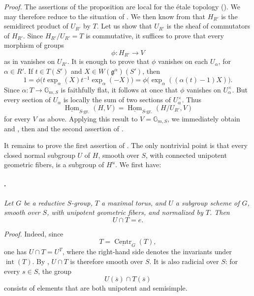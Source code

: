 \textit{Proof.}
The assertions of the proposition are local for the étale topology
\textup{()}. We may therefore reduce to the situation
of . We then know from  that \(H_{R'}\) is the semidirect
product of \(U_{R'}\) by \(T\). Let us show that \(U_{R'}\) is the
sheaf of commutators of \(H_{R'}\). Since
\(H_{R'}/U_{R'}=T\) is commutative, it suffices to prove that every
morphism of groups
\[
  \phi:H_{R'}\longrightarrow V
\]
as in \textup{} vanishes on \(U_{R'}\). It is enough to prove
that \(\phi\) vanishes on each \(U_\alpha\), for \(\alpha\in R'\).
If \(t\in T(S')\) and \(X\in W(\mathfrak g^\alpha)(S')\), then
\[
  1
  =
  \phi\bigl(t\exp_\alpha(X)t^{-1}\exp_\alpha(-X)\bigr)
  =
  \phi\bigl(\exp_\alpha((\alpha(t)-1)X)\bigr).
\]
Since \(\alpha:T\longrightarrow\mathbb G_{m,S}\) is faithfully
flat, it follows at once that \(\phi\) vanishes on
\(U_\alpha^\times\). But every section of \(U_\alpha\) is locally
the sum of two sections of \(U_\alpha^\times\). Thus
\[
  \underline{\operatorname{Hom}}_{S\text{-gr.}}(H,V)
  =
  \underline{\operatorname{Hom}}_{S\text{-gr.}}
    (H/U_{R'},V)
\]
for every \(V\) as above. Applying this result to
\(V=\mathbb G_{m,S}\), we immediately obtain \textup{} and
\textup{}, then \textup{} and the second assertion of
\textup{}.

It remains to prove the first assertion of \textup{}. The only
nontrivial point is that every closed normal subgroup \(U\) of
\(H\), smooth over \(S\), with connected unipotent geometric
fibers, is a subgroup of \(H^u\). We first have:

\paragraph{.}
\textit{Let \(G\) be a reductive \(S\)-group, \(T\) a maximal
torus, and \(U\) a subgroup scheme of \(G\), smooth over \(S\),
with unipotent geometric fibers, and normalized by \(T\). Then}
\[
  U\cap T=e.
\]

\textit{Proof.}
Indeed, since
\[
  T=\underline{\operatorname{Centr}}_G(T),
\]
one has \(U\cap T=U^T\), where the right-hand side denotes the
invariants under \(\operatorname{int}(T)\). By ,
\(U\cap T\) is therefore smooth over \(S\). It is also radicial
over \(S\): for every \(s\in S\), the group
\[
  U(\overline s)\cap T(\overline s)
\]
consists of elements that are both unipotent and semisimple.

